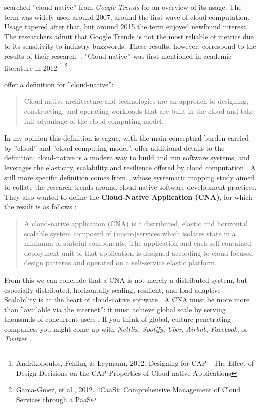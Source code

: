 \documentclass[utf8,english]{gradu3}
\begin{document}
\textcite[8]{Kratzke2017} searched ''cloud-native'' from \textit{Google Trends}
for an overview of its usage. The term was widely used around 2007, around the
first wave of cloud computation. Usage tapered after that, but around 2015 the
term enjoyed newfound interest. The researchers admit that Google Trends is not
the most reliable of metrics due to its sensitivity to industry buzzwords. These
results, however, correspond to the results of their research.
\textcite[8]{Kratzke2017}. ''Cloud-native'' was first mentioned in academic
literature in 2012 \footnote{Andrikopoulos, Fehling \& Leymann, 2012. Designing
  for CAP - The Effect of Design Decisions on the CAP Properties of Cloud-native
  Applications} \footnote{Garca-Gmez, et al., 2012. 4CaaSt: Comprehensive
  Management of Cloud Services through a PaaS} .

\textcite{Microsoft2022-CNA} offer a definition for ''cloud-native'':

\begin{quote} Cloud-native architecture and technologies are an approach to
  designing, constructing, and operating workloads that are built in the cloud and
  take full advantage of the cloud computing model.
\end{quote}

In my opinion this definition is vague, with the main conceptual burden carried
by ''cloud'' and ''cloud computing model''. \textcite{Patrizio2018} offer
additional details to the definition: cloud-native is a modern way to build and
run software systems, and leverages the elasticity, scalability and resilience
offered by cloud computation \textcite{Patrizio2018}. A still more specific
definition comes from \textcite{Kratzke2017}, whose systematic mapping study
aimed to collate the research trends around cloud-native software development
practices. They also wanted to define the \textbf{Cloud-Native Application
  (CNA)}, for which the result is as follows \parencite[13]{Kratzke2017}:

\begin{quote}
  A cloud-native application (CNA) is a distributed, elastic and horizontal
  scalable system composed of (micro)services which isolates state in a minimum
  of stateful components. The application and each self-contained deployment
  unit of that application is designed according to cloud-focused design
  patterns and operated on a self-service elastic platform.
\end{quote}

From this we can conclude that a CNA is not merely a distributed system, but
especially distributed, horizontally scaling, resilient, and load-adaptive
\parencite[13]{Kratzke2017}. Scalability is at the heart of cloud-native
software \parencite{CNAF2018}. A CNA must be more more than ''available via the
internet'': it must achieve global scale by serving thousands of concurrent
users \parencite[17]{Gannon2017}. If you think of global, culture-penetrating
companies, you might come up with \textit{Netflix}, \textit{Spotify},
\textit{Uber}, \textit{Airbnb}, \textit{Facebook}, or \textit{Twitter}
\parencites{Gannon2017}{Patrizio2018}.
\end{document}
